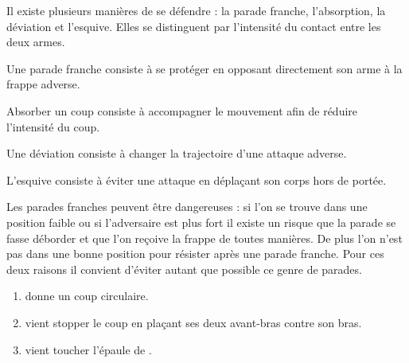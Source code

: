 Il existe plusieurs manières de se défendre : la parade franche, l'absorption, la déviation et l'esquive.
Elles se distinguent par l'intensité du contact entre les deux armes.


\begin{definition}

Une parade franche consiste à se protéger en opposant directement son arme à la frappe adverse.

\end{definition}


\begin{definition}[Absorption]

Absorber un coup consiste à accompagner le mouvement afin de réduire l'intensité du coup.

\end{definition}


\begin{definition}[Déviation]

Une déviation consiste à changer la trajectoire d'une attaque adverse.

\end{definition}


\begin{definition}[Esquive]

L'esquive consiste à éviter une attaque en déplaçant son corps hors de portée.

\end{definition}


Les parades franches peuvent être dangereuses : si l'on se trouve dans une position faible ou si l'adversaire est plus fort il existe un risque que la parade se fasse déborder et que l'on reçoive la frappe de toutes manières.
De plus l'on n'est pas dans une bonne position pour résister après une parade franche.
Pour ces deux raisons il convient d'éviter autant que possible ce genre de parades.


\begin{exercice}

\begin{enumerate}
	\item \A donne un coup circulaire.
	
	\item \D vient stopper le coup en plaçant ses deux avant-bras contre son bras.
	
	\item \D vient toucher l'épaule de \A.
\end{enumerate}
\end{exercice}


